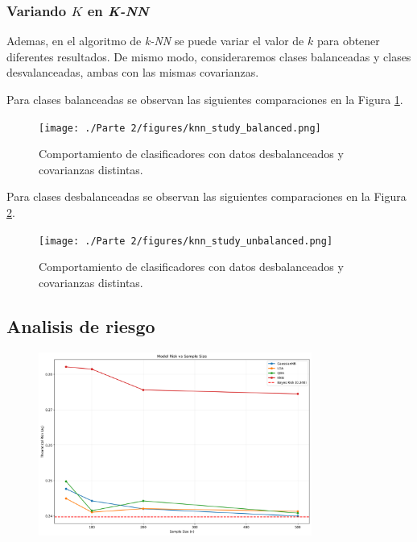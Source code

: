 \documentclass[10pt]{article}
\begin{document}
\newpage

\subsubsection*{Variando $K$ en \textit{K-NN}}

Ademas, en el algoritmo de \textit{k-NN} se puede variar el valor de $k$ para
obtener diferentes resultados. De mismo modo, consideraremos clases balanceadas
y clases desvalanceadas, ambas con las mismas covarianzas.

Para clases balanceadas se observan las siguientes comparaciones en la Figura
\ref{fig:knn-study-balanced}.

\begin{figure}[!ht]
    \centering
    \texttt{[image: ./Parte 2/figures/knn\_study\_balanced.png]}
    \caption{Comportamiento de clasificadores con datos desbalanceados y covarianzas distintas.}    
    \label{fig:knn-study-balanced}
\end{figure}

\newpage

Para clases desbalanceadas se observan las siguientes comparaciones en la Figura
\ref{fig:knn-study-unbalanced}.

\begin{figure}[!ht]
    \centering
    \texttt{[image: ./Parte 2/figures/knn\_study\_unbalanced.png]}
    \caption{Comportamiento de clasificadores con datos desbalanceados y covarianzas distintas.}    
    \label{fig:knn-study-unbalanced}
\end{figure}

\newpage

\subsection*{Analisis de riesgo}


\begin{figure}[!ht]
    \centering
    \includegraphics[width=0.8\textwidth]{./Parte 2/figures/risk_vs_samplesize.png}
    \caption{}
    \label{fig:risk-vs-samplesize}
\end{figure}
\end{document}
